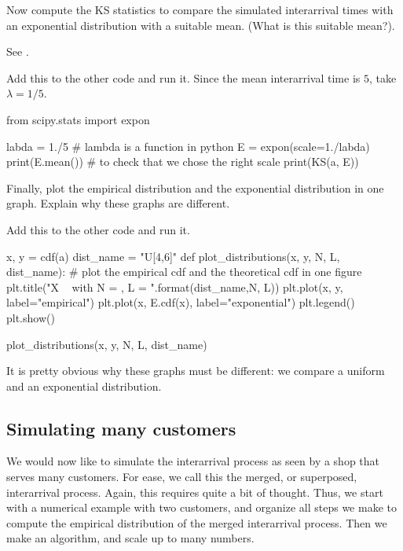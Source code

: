 \documentclass{scrartcl}
\begin{document}
\begin{exercise}
  Now compute the KS statistics to compare the simulated interarrival times with an exponential distribution with a suitable mean. (What is this suitable mean?).

See .


\begin{solution}
Add this to the other code and run it. Since the mean interarrival time is $5$, take $\lambda = 1/5$.

\begin{pyverbatim}
from scipy.stats import expon

labda = 1./5 # lambda is a function in python
E = expon(scale=1./labda) 
print(E.mean()) # to check that we chose the right scale
print(KS(a, E))    
\end{pyverbatim}
\end{solution}
\end{exercise}

\begin{exercise}
  Finally, plot the empirical distribution and the exponential distribution in one graph. Explain why these graphs are different.
\begin{solution}
Add this to the other code and run it. 
\begin{pyverbatim}
x, y = cdf(a)
dist_name = "U[4,6]"
def plot_distributions(x, y, N, L, dist_name):
    # plot the empirical cdf and the theoretical cdf in one figure
    plt.title("X ~ {} with N = {}, L = {}".format(dist_name,N, L))
    plt.plot(x, y, label="empirical")
    plt.plot(x, E.cdf(x), label="exponential")
    plt.legend()
    plt.show()

plot_distributions(x, y, N, L, dist_name)	
\end{pyverbatim}

It is pretty obvious why these graphs must be different: we compare a uniform and an exponential distribution. 
\end{solution}
\end{exercise}


\subsection{Simulating many customers}
\label{sec:simul-many-cust}

We would now like to simulate the interarrival process as seen by a shop that serves many customers. For ease, we call this the merged, or superposed, interarrival process. Again, this requires quite a bit of thought. Thus, we start with a numerical example with two customers, and organize all steps we make to compute the empirical distribution of the merged interarrival process. Then we make an algorithm, and scale up to many numbers. 
\end{document}
